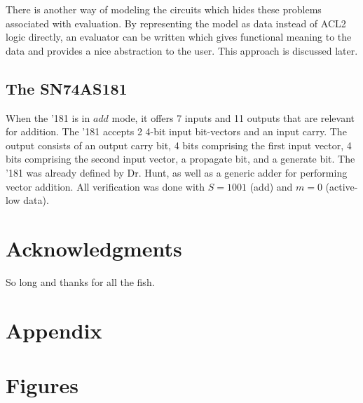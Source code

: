 \documentclass[fleqn,10pt]{SelfArx} %
\begin{document}
There is another way of modeling the circuits which hides these problems associated with evaluation. By representing the model as data instead of ACL2 logic directly, an evaluator can be written which gives functional meaning to the data and provides a nice abstraction to the user. This approach is discussed later.

\subsection{The SN74AS181}
When the '181 is in $add$ mode, it offers 7 inputs and 11 outputs that are relevant for addition. The '181 accepts 2 4-bit input bit-vectors and an input carry. The output consists of an output carry bit, 4 bits comprising the first input vector, 4 bits comprising the second input vector, a propagate bit, and a generate bit. The '181 was already defined by Dr. Hunt, as well as a generic adder for performing vector addition. All verification was done with $S=1001$ (add) and $m=0$ (active-low data). 
  
\section*{Acknowledgments} %


So long and thanks for all the fish.
\cite{Conway2000}





\appendix
\section*{Appendix}
\section{Figures}
\end{document}
